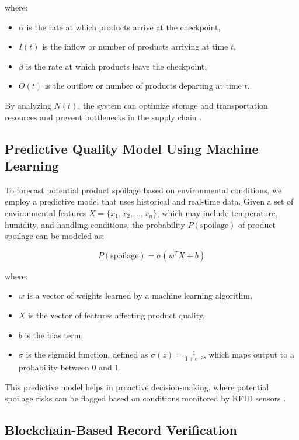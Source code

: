 \documentclass[conference]{IEEEtran}
\begin{document}
where:
\begin{itemize}
    \item \( \alpha \) is the rate at which products arrive at the checkpoint,
    \item \( I(t) \) is the inflow or number of products arriving at time \( t \),
    \item \( \beta \) is the rate at which products leave the checkpoint,
    \item \( O(t) \) is the outflow or number of products departing at time \( t \).
\end{itemize}

By analyzing \( N(t) \), the system can optimize storage and transportation resources and prevent bottlenecks in the supply chain \cite{hernandez2024implementation}.

\subsection{Predictive Quality Model Using Machine Learning}

To forecast potential product spoilage based on environmental conditions, we employ a predictive model that uses historical and real-time data. Given a set of environmental features \( X = \{ x_1, x_2, \dots, x_n \} \), which may include temperature, humidity, and handling conditions, the probability \( P(\text{spoilage}) \) of product spoilage can be modeled as:

\begin{equation}
    P(\text{spoilage}) = \sigma(w^T X + b)
\end{equation}

where:
\begin{itemize}
    \item \( w \) is a vector of weights learned by a machine learning algorithm,
    \item \( X \) is the vector of features affecting product quality,
    \item \( b \) is the bias term,
    \item \( \sigma \) is the sigmoid function, defined as \( \sigma(z) = \frac{1}{1 + e^{-z}} \), which maps output to a probability between 0 and 1.
\end{itemize}

This predictive model helps in proactive decision-making, where potential spoilage risks can be flagged based on conditions monitored by RFID sensors \cite{ahmed2024optimized}.

\subsection{Blockchain-Based Record Verification}
\end{document}
